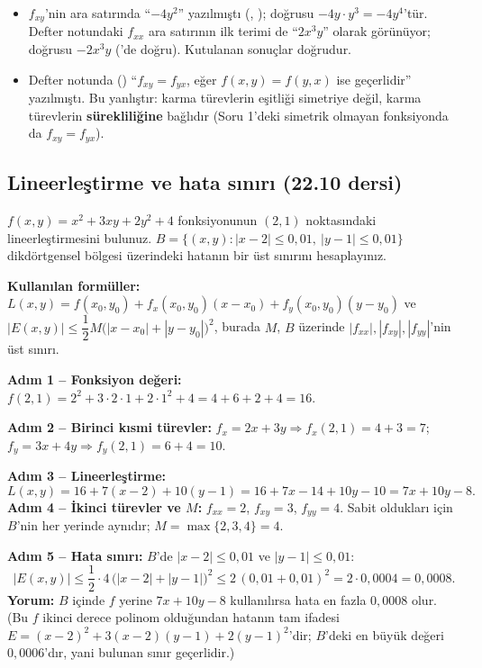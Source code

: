 \begin{dikkat}
\begin{itemize}
  \item $f_{xy}$'nin ara satırında ``$-4y^2$'' yazılmıştı (, );
        doğrusu $-4y\cdot y^3=-4y^4$'tür. Defter notundaki $f_{xx}$ ara satırının ilk terimi de ``$2x^3y$'' olarak
        görünüyor; doğrusu $-2x^3y$ ('de doğru). Kutulanan sonuçlar doğrudur.
  \item Defter notunda () ``$f_{xy}=f_{yx}$, eğer $f(x,y)=f(y,x)$ ise geçerlidir'' yazılmıştı.
        Bu yanlıştır: karma türevlerin eşitliği simetriye değil, karma türevlerin \textbf{sürekliliğine} bağlıdır
        (Soru 1'deki simetrik olmayan fonksiyonda da $f_{xy}=f_{yx}$).
\end{itemize}
\end{dikkat}

\subsection{Lineerleştirme ve hata sınırı (22.10 dersi)}

\begin{soru}
$f(x,y)=x^2+3xy+2y^2+4$ fonksiyonunun $(2,1)$ noktasındaki lineerleştirmesini bulunuz.
$B=\{(x,y):|x-2|\le0{,}01,\ |y-1|\le0{,}01\}$ dikdörtgensel bölgesi üzerindeki hatanın bir üst sınırını hesaplayınız.
\end{soru}
\begin{cevap}
\textbf{Kullanılan formüller:}
$L(x,y)=f(x_0,y_0)+f_x(x_0,y_0)(x-x_0)+f_y(x_0,y_0)(y-y_0)$ ve
$|E(x,y)|\le\dfrac12M\big(|x-x_0|+|y-y_0|\big)^2$, burada $M$, $B$ üzerinde $|f_{xx}|,|f_{xy}|,|f_{yy}|$'nin üst sınırı.

\textbf{Adım 1 -- Fonksiyon değeri:} $f(2,1)=2^2+3\cdot2\cdot1+2\cdot1^2+4=4+6+2+4=16$.

\textbf{Adım 2 -- Birinci kısmi türevler:}
$f_x=2x+3y\Rightarrow f_x(2,1)=4+3=7$;\quad $f_y=3x+4y\Rightarrow f_y(2,1)=6+4=10$.

\textbf{Adım 3 -- Lineerleştirme:}
\[ L(x,y)=16+7(x-2)+10(y-1)=16+7x-14+10y-10=7x+10y-8 . \]
\textbf{Adım 4 -- İkinci türevler ve $M$:} $f_{xx}=2$, $f_{xy}=3$, $f_{yy}=4$. Sabit oldukları için $B$'nin her yerinde
aynıdır; $M=\max\{2,3,4\}=4$.

\textbf{Adım 5 -- Hata sınırı:} $B$'de $|x-2|\le0{,}01$ ve $|y-1|\le0{,}01$:
\[
|E(x,y)|\le\frac12\cdot4\,\big(|x-2|+|y-1|\big)^2\le2\,(0{,}01+0{,}01)^2=2\cdot0{,}0004=0{,}0008 .
\]
\textbf{Yorum:} $B$ içinde $f$ yerine $7x+10y-8$ kullanılırsa hata en fazla $0{,}0008$ olur. (Bu $f$ ikinci derece polinom
olduğundan hatanın tam ifadesi $E=(x-2)^2+3(x-2)(y-1)+2(y-1)^2$'dir; $B$'deki en büyük değeri $0{,}0006$'dır, yani bulunan
sınır geçerlidir.)
\end{cevap}

